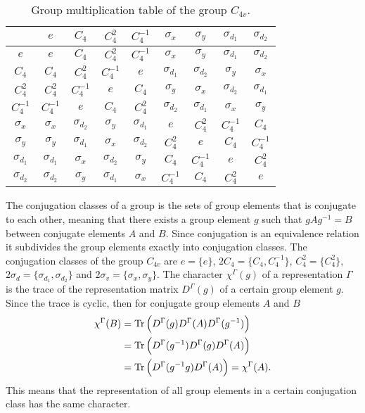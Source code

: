 \begin{table}
    \centering
    \begin{tabular}{c|cccc|cccc}
        & $e$ & $C_4$ &$C_4^2$ & $C_4^{-1}$ & $\sigma_x$ & $\sigma_y$ & $\sigma_{d_1}$ & $\sigma_{d_2}$\\ \hline
        $e$ & $e$ & $C_4$ & $C_4^2$ & $C_4^{-1}$ & $\sigma_x$ & $\sigma_y$ & $\sigma_{d_1}$ & $\sigma_{d_2}$\\
        $C_4$ & $C_4$ & $C_4^2$ & $C_4^{-1}$ & $e$ & $\sigma_{d_1}$ & $\sigma_{d_2}$ & $\sigma_y$ & $\sigma_x$\\
        $C_4^2$ & $C_4^2$ & $C_4^{-1}$ & $e$ & $C_4$ & $\sigma_y$ & $\sigma_x$ & $\sigma_{d_2}$ & $\sigma_{d_1}$\\
        $C_4^{-1}$ & $C_4^{-1}$ & $e$ & $C_4$ & $C_4^2$ & $\sigma_{d_2}$ & $\sigma_{d_1}$ & $\sigma_x$ & $\sigma_y$\\ \hline
        $\sigma_x$ & $\sigma_x$ & $\sigma_{d_2}$ & $\sigma_y$ & $\sigma_{d_1}$ & $e$ & $C_4^2$ & $C_4^{-1}$ & $C_4$\\
        $\sigma_y$ & $\sigma_y$ & $\sigma_{d_1}$ & $\sigma_x$ & $\sigma_{d_2}$ & $C_4^2$ & $e$ & $C_4$ & $C_4^{-1}$\\
        $\sigma_{d_1}$ & $\sigma_{d_1}$ & $\sigma_x$ & $\sigma_{d_2}$ & $\sigma_y$ & $C_4$ & $C_4^{-1}$ & $e$ & $C_4^2$\\
        $\sigma_{d_2}$ & $\sigma_{d_2}$ & $\sigma_y$ & $\sigma_{d_1}$ & $\sigma_x$ & $C_4^{-1}$ & $C_4$ & $C_4^2$ & $e$
    \end{tabular}
    \caption{Group multiplication table of the group $C_{4v}$.}
    \label{tab:Group:Symm:multTab}
\end{table}

The conjugation classes of a group is the sets of group elements that is conjugate to each other, meaning that there exists a group element $g$ such
that $gAg^{-1} = B$ between conjugate elements $A$ and $B$. Since conjugation is an equivalence relation it subdivides the group elements
exactly into conjugation classes. The conjugation classes of the group $C_{4v}$ are $e = \{e\}$, $2C_4 = \{C_4,C_4^{-1}\}$, $C_4^2 = \{C_4^2\}$,
$2\sigma_d = \{\sigma_{d_1},\sigma_{d_2}\}$ and $2\sigma_v = \{\sigma_x,\sigma_y\}$. The character $\chi^\Gamma(g)$ of a representation $\Gamma$ is the trace of the representation
matrix $D^\Gamma(g)$ of a certain group element $g$. Since the trace is cyclic, then for conjugate group elements $A$ and $B$
\begin{equation}
    \label{eq:Group:Symm:conjugateCharacter}
    \begin{split}
        \chi^\Gamma(B) &= \operatorname{Tr}\Big(D^\Gamma(g)D^\Gamma(A)D^\Gamma(g^{-1})\Big)\\
        &= \operatorname{Tr}\Big(D^\Gamma(g^{-1})D^\Gamma(g)D^\Gamma(A)\Big)\\
        &= \operatorname{Tr}\Big(D^\Gamma(g^{-1}g)D^\Gamma(A)\Big) = \chi^\Gamma(A).
    \end{split}
\end{equation}
This means that the representation of all group elements in a certain conjugation class has the same character. 

